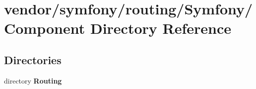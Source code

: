 \section{vendor/symfony/routing/\+Symfony/\+Component Directory Reference}
\label{dir_06f9700a1b8dd90553739c30f31c739d}
\subsection*{Directories}
\begin{DoxyCompactItemize}
\item 
directory {\bf Routing}
\end{DoxyCompactItemize}
